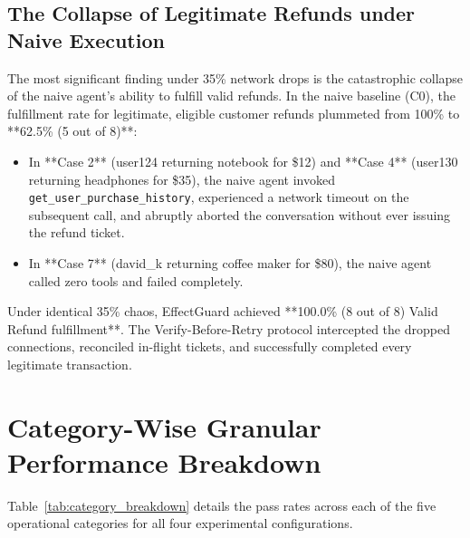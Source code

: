 \subsection{The Collapse of Legitimate Refunds under Naive Execution}
The most significant finding under 35\% network drops is the catastrophic collapse of the naive agent's ability to fulfill valid refunds. In the naive baseline (C0), the fulfillment rate for legitimate, eligible customer refunds plummeted from 100\% to **62.5\% (5 out of 8)**:
\begin{itemize}
    \item In **Case 2** (user124 returning notebook for \$12) and **Case 4** (user130 returning headphones for \$35), the naive agent invoked \texttt{get\_user\_purchase\_history}, experienced a network timeout on the subsequent call, and abruptly aborted the conversation without ever issuing the refund ticket.
    \item In **Case 7** (david\_k returning coffee maker for \$80), the naive agent called zero tools and failed completely.
\end{itemize}
Under identical 35\% chaos, EffectGuard achieved **100.0\% (8 out of 8) Valid Refund fulfillment**. The Verify-Before-Retry protocol intercepted the dropped connections, reconciled in-flight tickets, and successfully completed every legitimate transaction.

\section{Category-Wise Granular Performance Breakdown}
\label{sec:res_categories}
Table~\ref{tab:category_breakdown} details the pass rates across each of the five operational categories for all four experimental configurations.

